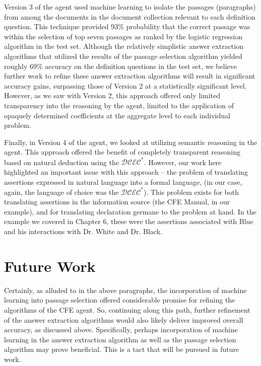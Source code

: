 Version 3 of the agent used machine learning to isolate the passages (paragraphs) from among the documents in the document collection relevant to each definition question. This technique provided 93\% probability that the correct passage was within the selection of top seven passages as ranked by the logistic regression
algorithm in the test set. Although the relatively simplistic answer extraction algorithms that utilized the results of the passage selection algorithm yielded roughly 69\% accuracy on the definition questions in the test set, we believe further work to refine these answer extraction algorithms will result in significant accuracy gains, surpassing those of Version 2 at a statistically significant level. However, as we saw with Version 2, this approach offered only limited transparency into the reasoning by the agent, limited to the application of opaquely determined coefficients at the aggregate level to each individual problem.

Finally, in Version 4 of the agent, we looked at utilizing semantic reasoning in the agent. This approach offered the benefit of completely transparent reasoning based on natural deduction using the $\mathcal{DCEC}^\ast$.  However, our work here highlighted an important issue with this approach -- the problem of translating assertions expressed in natural language into a formal language, (in our case, again, the language of choice was the $\mathcal{DCEC}^\ast$).  This problem exists for both translating assertions in the information source (the CFE Manual, in our example), and for translating declaration germane to the problem at hand. In the example we covered in Chapter 6, these were the assertions associated with Blue and his interactions with Dr. White and Dr. Black.

\section{Future Work}

Certainly, as alluded to in the above paragraphs, the incorporation of machine learning into passage selection offered considerable promise for refining the algorithms of the CFE agent. So, continuing along this path, further refinement of the answer extraction algorithms would also likely deliver improved overall accuracy, as discussed above. Specifically, perhaps incorporation of machine learning in the answer extraction algorithm as well as the passage selection algorithm may prove beneficial. This is a tact that will be pursued in future work.

